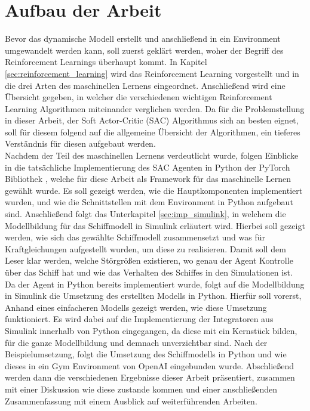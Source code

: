 \documentclass[]{iat}
\begin{document}
\section{Aufbau der Arbeit} \label{sec:aufbau_arbeit}
Bevor das dynamische Modell erstellt und anschließend in ein Environment umgewandelt werden kann, soll zuerst geklärt werden, woher der Begriff des Reinforcement Learnings überhaupt kommt. In Kapitel \ref{sec:reinforcement_learning} wird das Reinforcement Learning vorgestellt und in die drei Arten des maschinellen Lernens eingeordnet. Anschließend wird eine Übersicht gegeben, in welcher die verschiedenen wichtigen Reinforcement Learning Algorithmen miteinander verglichen werden. Da für die Problemstellung in dieser Arbeit, der Soft Actor-Critic (SAC) \cite[]{sacv2} Algorithmus sich an besten eignet, soll für diesem folgend auf die allgemeine Übersicht der Algorithmen, ein tieferes Verständnis für diesen aufgebaut werden.\\
Nachdem der Teil des maschinellen Lernens verdeutlicht wurde, folgen Einblicke in die tatsächliche Implementierung des SAC Agenten in Python der PyTorch Bibliothek \cite[]{pytorch}, welche für diese Arbeit als Framework für das maschinelle Lernen gewählt wurde. Es soll gezeigt werden, wie die Hauptkomponenten implementiert wurden, und wie die Schnittstellen mit dem Environment in Python aufgebaut sind. Anschließend folgt das Unterkapitel \ref{sec:imp_simulink}, in welchem die Modellbildung für das Schiffmodell in Simulink erläutert wird. Hierbei soll gezeigt werden, wie sich das gewählte Schiffmodell zusammensetzt und was für Kraftgleichungen aufgestellt wurden, um diese zu realisieren. Damit soll dem Leser klar werden, welche Störgrößen existieren, wo genau der Agent Kontrolle über das Schiff hat und wie das Verhalten des Schiffes in den Simulationen ist. Da der Agent in Python bereits implementiert wurde, folgt auf die Modellbildung in Simulink die Umsetzung des erstellten Modells in Python. Hierfür soll vorerst, Anhand eines einfacheren Modells gezeigt werden, wie diese Umsetzung funktioniert. Es wird dabei auf die Implementierung der Integratoren aus Simulink innerhalb von Python eingegangen, da diese mit ein Kernstück bilden, für die ganze Modellbildung und demnach unverzichtbar sind. Nach der Beispielumsetzung, folgt die Umsetzung des Schiffmodells in Python und wie dieses in ein Gym Environment von OpenAI \cite[]{brockman2016openai} eingebunden wurde. Abschließend werden dann die verschiedenen Ergebnisse dieser Arbeit präsentiert, zusammen mit einer Diskussion wie diese zustande kommen und einer anschließenden Zusammenfassung mit einem Ausblick auf weiterführenden Arbeiten.
\end{document}

